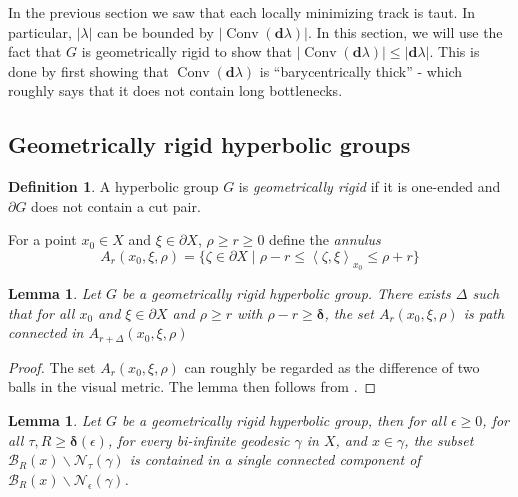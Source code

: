 \documentclass{amsart}
\numberwithin{equation}{section}
\newtheorem{lemma}[theorem]{Lemma}
\theoremstyle{definition}
\newtheorem{definition}[theorem]{Definition}
\newcommand{\bfd}{\mathbf{d}}
\newcommand{\calB}{\mathcal{B}}
\newcommand{\calN}{\mathcal{N}}
\newcommand{\gen}[1]{\left< #1 \right>}
\newcommand{\bdelta}{{\boldsymbol\delta}}
\newcommand{\ssm}{\smallsetminus}
\DeclareMathOperator{\conv}{Conv}
\begin{document}
    In the previous section we saw that each locally minimizing track is taut. In particular, $|\lambda|$ can be bounded by  $|\conv(\bfd\lambda)|$.
    In this section, we will use the fact that $G$ is geometrically rigid to show that $|\conv(\bfd\lambda)|\le |\bfd\lambda|$.
    This is done by first showing that $\conv(\bfd\lambda)$ is ``barycentrically thick'' - which roughly says that it does not contain long bottlenecks. 

\subsection{Geometrically rigid hyperbolic groups}

\begin{definition}
    A hyperbolic group $G$ is \emph{geometrically rigid} if it is one-ended and $\partial G$ does not contain a cut pair.
\end{definition}

For a point $x_0\in X$ and $\xi\in \partial X$, $\rho\ge r\ge 0$ define the \emph{annulus}
$$A_r(x_0,\xi,\rho) = \{\zeta\in \partial X\;|\;\rho-r\le \gen{\zeta,\xi}_{x_0}\le \rho+r\}$$


\begin{lemma}\label{annuli in the boundary}
    Let $G$ be a geometrically rigid hyperbolic group. There exists $\Delta$ such that for all $x_0$ and $\xi\in \partial X$ and $\rho\ge r$ with $\rho -r\ge \bdelta$, the set $A_r(x_0,\xi,\rho)$ is path connected in $A_{r+\Delta}(x_0,\xi,\rho)$
\end{lemma}

\begin{proof}
    The set $A_r(x_0,\xi,\rho)$ can roughly be regarded as the difference of two balls in the visual metric.
    The lemma then follows from \cite[Lemma 6.1]{lazarovich2023commensurated}.
\end{proof}

\begin{lemma}\label{ball minus geodesic is connected}
    Let $G$ be a geometrically rigid hyperbolic group, then for all $\epsilon\ge0$, for all $\tau,R\ge \bdelta(\epsilon)$, for every bi-infinite geodesic $\gamma$ in $X$, and $x\in \gamma$, the subset $\calB_R(x)\ssm \calN_\tau(\gamma)$ is contained in a single connected component of $\calB_R(x) \ssm \calN_\epsilon(\gamma)$.
\end{lemma}
\end{document}
